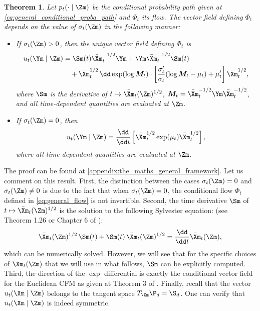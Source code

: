 \documentclass[10pt]{article} %
\theoremstyle{plain}
\newtheorem{theorem}{Theorem}[section]
\theoremstyle{definition}
\theoremstyle{remark}
\begin{document}
\begin{theorem}
  \label{theo:general_u_cond}
  Let $p_t(\cdot \mid \Zm)$ be the conditional probability path given at \cref{eq:general_conditional_proba_path}
  and $\Phi_t$ its flow. The vector field defining $\Phi_t$ depends on the value of $\sigma_t(\Zm)$ in the following manner:
  \begin{itemize}
    \item If $\sigma_t(\Zm) > 0$, then the unique vector field defining $\Phi_t$ is
      \begin{equation*}
        \begin{aligned}
          u_t(\Ym \mid \Zm)
          &= \Sm(t)\bar{\Xm}_t^{-1/2}\Ym + \Ym\bar{\Xm}_t^{-1/2}\Sm(t) \\
          &\quad + \bar{\Xm}_t^{1/2}
          \,\dd\exp(\log \bm M_t)\cdot
          \left[
            \frac{\sigma_t'}{\sigma_t}(\log \bm M_t - \mu_t)
            + \mu_t'
          \right]
          \bar{\Xm}_t^{1/2},
        \end{aligned}
      \end{equation*}
      where $\Sm$ is the derivative of $t \mapsto \bar{\Xm}_t(\Zm)^{1/2}$, $\bm M_t = \bar{\Xm}_t^{-1/2}\Ym\bar{\Xm}_t^{-1/2}$, and all
      time-dependent quantities are evaluated at $\Zm$.
    \item If $\sigma_t(\Zm) = 0$, then
      \[
        u_t(\Ym \mid \Zm) = \frac{\dd}{\dd t}\left[\bar{\Xm}_t^{1/2}\exp(\mu_t)\bar{\Xm}_t^{1/2}\right],
      \]
      where all time-dependent quantities are evaluated at $\Zm$.
  \end{itemize}

\end{theorem}
The proof can be found at \cref{appendix:the_maths_general_framework}. Let us comment on this result. First, the distinction between the cases $\sigma_t(\Zm) = 0$ and $\sigma_t(\Zm) \neq 0$ is due to the fact that when $\sigma_t(\Zm) = 0$, the conditional flow $\Phi_t$ defined in \cref{eq:general_flow} is not invertible. Second, the time derivative $\Sm$ of $t \mapsto \bar{\Xm}_t(\Zm)^{1/2}$ is the solution to the following Sylvester equation:
(see Theorem 1.26 or Chapter 6 of \citealt{highamFunctionsMatrices2008}):
\begin{equation}
  \label{eq:sylvester_eq}
  \bar{\Xm}_t(\Zm)^{1/2} \,\Sm(t) + \Sm(t)\, \bar{\Xm}_t(\Zm)^{1/2} = \frac{\dd}{\dd t}\bar{\Xm}_t(\Zm),
\end{equation}
which can be numerically solved. However, we will see that for the specific choices of $\bar{\Xm}_t(\Zm)$ that we will use in what follows, $\Sm$ can be explicitly computed. Third, the direction of the $\exp$ differential is exactly the conditional vector field for the Euclidean CFM as given at Theorem 3 of \cite{lipmanFlowMatchingGenerative2023}.  Finally, recall that the vector $u_t(\Xm \mid \Zm)$ belongs to the tangent space $T_{\Xm} \P_d = \S_d$. One can verify that $u_t(\Xm \mid \Zm)$ is indeed symmetric.
\end{document}
